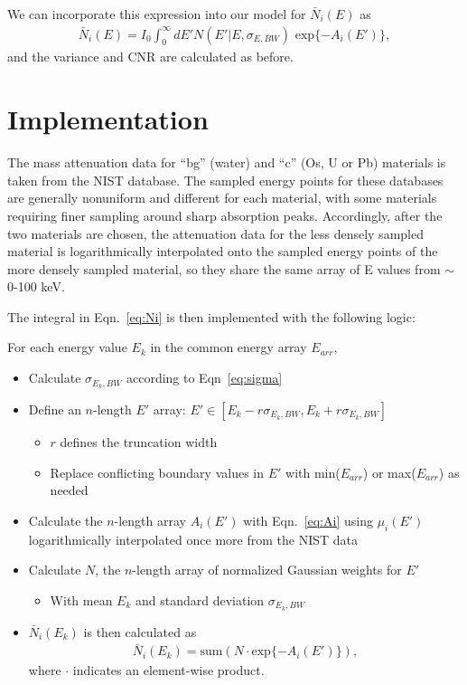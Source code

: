 \documentclass[11pt]{article}
\begin{document}
We can incorporate this expression into our model for $\bar{N}_i(E)$ as
\begin{align}
  \bar{N}_i(E) = I_0\int_0^{\infty} dE'N(E' | E, \sigma_{E,BW})\text{ exp}\{-A_i(E')\},
  \label{eq:Ni}
\end{align}
and the variance and CNR are calculated as before.

\section{Implementation}
The mass attenuation data for ``bg'' (water) and ``c'' (Os, U or Pb) materials
is taken from the NIST database. The sampled energy points for these databases
are generally nonuniform and different for each material, with some materials
requiring finer sampling around sharp absorption peaks. Accordingly, after the
two materials are chosen, the attenuation data for the less densely sampled
material is logarithmically interpolated onto the sampled energy points of the
more densely sampled material, so they share the same array of E values from
$\sim$0-100 keV.

The integral in Eqn.~\ref{eq:Ni} is then implemented with the following logic:\newline

For each energy value $E_k$ in the common energy array $E_{arr}$,
\begin{itemize}
\item Calculate $\sigma_{E_k,BW}$ according to Eqn~\ref{eq:sigma}
\item Define an $n$-length $E'$ array: $E' \in [E_k-r\sigma_{E_k, BW}, E_k+r\sigma_{E_k, BW}]$
  \begin{itemize}
  \item $r$ defines the truncation width 
  \item Replace conflicting boundary values in $E'$ with min($E_{arr}$) or max($E_{arr}$) as needed
  \end{itemize}
\item Calculate the $n$-length array $A_i(E')$ with Eqn.~\ref{eq:Ai} using
  $\mu_i(E')$ logarithmically interpolated once more from the NIST data
\item Calculate $N$, the $n$-length array of normalized Gaussian weights for $E'$
  \begin{itemize}
  \item With mean $E_k$ and standard deviation $\sigma_{E_k,BW}$
  \end{itemize}
\item $\bar{N}_i(E_k)$ is then calculated as
  \begin{align}
    \bar{N}_i(E_k) = \text{sum}(N\cdot\text{exp}\{-A_i(E')\}),
  \end{align}
  where $\cdot$ indicates an element-wise product.
  
\end{itemize}
\end{document}
